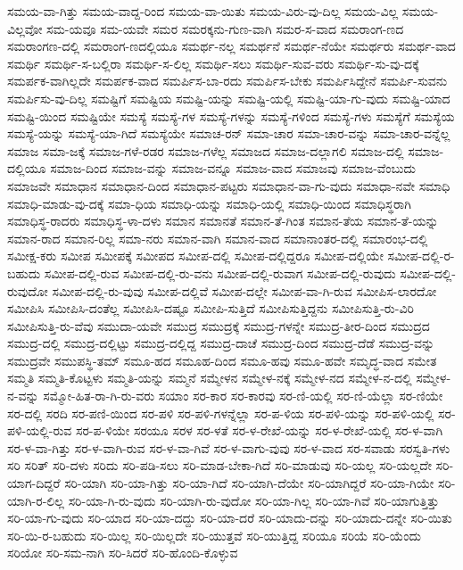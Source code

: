 {ಸಮಯ-ವಾ-ಗಿತ್ತು
ಸಮಯ-ವಾದ್ದ-ರಿಂದ
ಸಮಯ-ವಾ-ಯಿತು
ಸಮಯ-ವಿರು-ವು-ದಿಲ್ಲ
ಸಮಯ-ವಿಲ್ಲ
ಸಮಯ-ವಿಲ್ಲವೋ
ಸಮ-ಯವೂ
ಸಮ-ಯವೇ
ಸಮರ
ಸಮರಕ್ಕನು-ಗುಣ-ವಾಗಿ
ಸಮರ-ಸ-ವಾದ
ಸಮರಾಂಗ-ಣದ
ಸಮರಾಂಗಣ-ದಲ್ಲಿ
ಸಮರಾಂಗ-ಣದಲ್ಲಿಯೂ
ಸಮರ್ಥ-ನಲ್ಲ
ಸಮರ್ಥನೆ
ಸಮರ್ಥ-ನೆಯೇ
ಸಮರ್ಥರು
ಸಮರ್ಥ-ವಾದ
ಸಮರ್ಥಿ
ಸಮರ್ಥಿ-ಸ-ಬಲ್ಲಿರಾ
ಸಮರ್ಥಿ-ಸ-ಲಿಲ್ಲ
ಸಮರ್ಥಿ-ಸಲು
ಸಮರ್ಥಿ-ಸುವ-ವರು
ಸಮರ್ಥಿ-ಸು-ವು-ದಕ್ಕೆ
ಸಮರ್ಪಕ-ವಾಗಿಲ್ಲದೇ
ಸಮರ್ಪಕ-ವಾದ
ಸಮರ್ಪಿಸ-ಬಾ-ರದು
ಸಮರ್ಪಿಸ-ಬೇಕು
ಸಮರ್ಪಿಸಿದ್ದೇನೆ
ಸಮರ್ಪಿ-ಸುವನು
ಸಮರ್ಪಿಸು-ವು-ದಿಲ್ಲ
ಸಮಷ್ಟಿಗೆ
ಸಮಷ್ಟಿಯ
ಸಮಷ್ಟಿ-ಯನ್ನು
ಸಮಷ್ಟಿ-ಯಲ್ಲಿ
ಸಮಷ್ಟಿ-ಯಾ-ಗು-ವುದು
ಸಮಷ್ಟಿ-ಯಾದ
ಸಮಷ್ಟಿ-ಯಿಂದ
ಸಮಷ್ಟಿಯೇ
ಸಮಸ್ಯೆ
ಸಮಸ್ಯೆ-ಗಳ
ಸಮಸ್ಯೆ-ಗಳನ್ನು
ಸಮಸ್ಯೆ-ಗಳಿಂದ
ಸಮಸ್ಯೆ-ಗಳು
ಸಮಸ್ಯೆಗೆ
ಸಮಸ್ಯೆಯ
ಸಮಸ್ಯೆ-ಯನ್ನು
ಸಮಸ್ಯೆ-ಯಾ-ಗಿದೆ
ಸಮಸ್ಯೆಯೇ
ಸಮಾಚ-ರನ್
ಸಮಾ-ಚಾರ
ಸಮಾ-ಚಾರ-ವನ್ನು
ಸಮಾ-ಚಾರ-ವನ್ನೆಲ್ಲ
ಸಮಾಜ
ಸಮಾ-ಜಕ್ಕೆ
ಸಮಾಜ-ಗಳೆ-ರಡರ
ಸಮಾಜ-ಗಳೆಲ್ಲ
ಸಮಾಜದ
ಸಮಾಜ-ದಲ್ಲಾಗಲಿ
ಸಮಾಜ-ದಲ್ಲಿ
ಸಮಾಜ-ದಲ್ಲಿಯೂ
ಸಮಾಜ-ದಿಂದ
ಸಮಾಜ-ವನ್ನು
ಸಮಾಜ-ವನ್ನೂ
ಸಮಾಜ-ವಾದ
ಸಮಾಜವು
ಸಮಾಜ-ವೆಂಬುದು
ಸಮಾಜವೇ
ಸಮಾಧಾನ
ಸಮಾಧಾನ-ದಿಂದ
ಸಮಾಧಾನ-ಪಟ್ಟರು
ಸಮಾಧಾನ-ವಾ-ಗು-ವುದು
ಸಮಾಧಾ-ನವೇ
ಸಮಾಧಿ
ಸಮಾಧಿ-ಮಾಡು-ವು-ದಕ್ಕೆ
ಸಮಾ-ಧಿಯ
ಸಮಾಧಿ-ಯನ್ನು
ಸಮಾಧಿ-ಯಲ್ಲಿ
ಸಮಾಧಿ-ಯಿಂದ
ಸಮಾಧಿಸ್ಥರಾಗಿ
ಸಮಾಧಿಸ್ಥ-ರಾದರು
ಸಮಾಧಿಸ್ಥ-ಳಾ-ದಳು
ಸಮಾನ
ಸಮಾನತೆ
ಸಮಾನ-ತೆ-ಗಿಂತ
ಸಮಾನ-ತೆಯ
ಸಮಾನ-ತೆ-ಯನ್ನು
ಸಮಾನ-ರಾದ
ಸಮಾನ-ರಿಲ್ಲ
ಸಮಾ-ನರು
ಸಮಾನ-ವಾಗಿ
ಸಮಾನ-ವಾದ
ಸಮಾನಾಂತರ-ದಲ್ಲಿ
ಸಮಾರಂಭ-ದಲ್ಲಿ
ಸಮೀಕ್ಷ-ಕರು
ಸಮೀಪ
ಸಮೀಪಕ್ಕೆ
ಸಮೀಪದ
ಸಮೀಪ-ದಲ್ಲಿ
ಸಮೀಪ-ದಲ್ಲಿದ್ದರೂ
ಸಮೀಪ-ದಲ್ಲಿಯೇ
ಸಮೀಪ-ದಲ್ಲಿ-ರ-ಬಹುದು
ಸಮೀಪ-ದಲ್ಲಿ-ರುವ
ಸಮೀಪ-ದಲ್ಲಿ-ರು-ವನು
ಸಮೀಪ-ದಲ್ಲಿ-ರುವಾಗ
ಸಮೀಪ-ದಲ್ಲಿ-ರುವುದು
ಸಮೀಪ-ದಲ್ಲಿ-ರುವುದೋ
ಸಮೀಪ-ದಲ್ಲಿ-ರು-ವುವು
ಸಮೀಪ-ದಲ್ಲಿವೆ
ಸಮೀಪ-ದಲ್ಲೇ
ಸಮೀಪ-ವಾ-ಗಿ-ರುವ
ಸಮೀಪಿಸ-ಲಾರದೋ
ಸಮೀಪಿಸಿ
ಸಮೀಪಿಸಿ-ದಂತೆಲ್ಲ
ಸಮೀಪಿಸಿ-ದಷ್ಟೂ
ಸಮೀಪಿ-ಸುತ್ತಿದೆ
ಸಮೀಪಿಸುತ್ತಿದ್ದನು
ಸಮೀಪಿಸುತ್ತಿ-ರು-ವಿರಿ
ಸಮೀಪಿಸುತ್ತಿ-ರು-ವೆವು
ಸಮುದಾ-ಯವೇ
ಸಮುದ್ರ
ಸಮುದ್ರಕ್ಕೆ
ಸಮುದ್ರ-ಗಳನ್ನೇ
ಸಮುದ್ರ-ತೀರ-ದಿಂದ
ಸಮುದ್ರದ
ಸಮುದ್ರ-ದಲ್ಲಿ
ಸಮುದ್ರ-ದಲ್ಲಿಟ್ಟು
ಸಮುದ್ರ-ದಲ್ಲಿದ್ದ
ಸಮುದ್ರ-ದಾಚೆ
ಸಮುದ್ರ-ದಿಂದ
ಸಮುದ್ರ-ದೆಡೆ
ಸಮುದ್ರ-ವನ್ನು
ಸಮುದ್ರವೇ
ಸಮುಪಸ್ಥಿ-ತಮ್
ಸಮೂ-ಹದ
ಸಮೂಹ-ದಿಂದ
ಸಮೂ-ಹವು
ಸಮೂ-ಹವೇ
ಸಮೃದ್ಧ-ವಾದ
ಸಮೇತ
ಸಮ್ಮತಿ
ಸಮ್ಮತಿ-ಕೊಟ್ಟಳು
ಸಮ್ಮತಿ-ಯನ್ನು
ಸಮ್ಮನೆ
ಸಮ್ಮೇಳನ
ಸಮ್ಮೇಳ-ನಕ್ಕೆ
ಸಮ್ಮೇಳ-ನದ
ಸಮ್ಮೇಳ-ನ-ದಲ್ಲಿ
ಸಮ್ಮೇಳ-ನ-ವನ್ನು
ಸಮ್ಮೋ-ಹಿತ-ರಾ-ಗಿ-ರು-ವರು
ಸಯಾಂ
ಸರ-ಕಾರ
ಸರ-ಕಾರವು
ಸರ-ಣಿ-ಯಲ್ಲಿ
ಸರ-ಣಿ-ಯೆಲ್ಲಾ
ಸರ-ಣಿಯೇ
ಸರ-ದಲ್ಲಿ
ಸರದಿ
ಸರ-ಪಣಿ-ಯಿಂದ
ಸರ-ಪಳಿ
ಸರ-ಪಳಿ-ಗಳನ್ನೆಲ್ಲಾ
ಸರ-ಪ-ಳಿಯ
ಸರ-ಪಳಿ-ಯನ್ನು
ಸರ-ಪಳಿ-ಯಲ್ಲಿ
ಸರ-ಪಳಿ-ಯಲ್ಲಿ-ರುವ
ಸರ-ಪ-ಳಿಯೇ
ಸರಯೂ
ಸರಳ
ಸರ-ಳತೆ
ಸರ-ಳ-ರೇಖೆ-ಯನ್ನು
ಸರ-ಳ-ರೇಖೆ-ಯಲ್ಲಿ
ಸರ-ಳ-ವಾಗಿ
ಸರ-ಳ-ವಾ-ಗಿತ್ತು
ಸರ-ಳ-ವಾಗಿ-ರುವ
ಸರ-ಳ-ವಾ-ಗಿವೆ
ಸರ-ಳ-ವಾಗು-ವುವು
ಸರ-ಳ-ವಾದ
ಸರ-ಸವಾಡು
ಸರಸ್ವತಿ-ಗಳು
ಸರಿ
ಸರಿತ್
ಸರಿ-ದಳು
ಸರಿದು
ಸರಿ-ಪಡಿ-ಸಲು
ಸರಿ-ಮಾಡ-ಬೇಕಾ-ಗಿದೆ
ಸರಿ-ಮಾಡುವು
ಸರಿ-ಯಲ್ಲ
ಸರಿ-ಯಲ್ಲದೇ
ಸರಿ-ಯಾಗ-ದಿದ್ದರೆ
ಸರಿ-ಯಾಗಿ
ಸರಿ-ಯಾ-ಗಿತ್ತು
ಸರಿ-ಯಾ-ಗಿದೆ
ಸರಿ-ಯಾಗಿ-ದೆಯೇ
ಸರಿ-ಯಾಗಿದ್ದರೆ
ಸರಿ-ಯಾ-ಗಿಯೇ
ಸರಿ-ಯಾಗಿ-ರ-ಲಿಲ್ಲ
ಸರಿ-ಯಾ-ಗಿ-ರು-ವುದು
ಸರಿ-ಯಾಗಿ-ರು-ವುದೋ
ಸರಿ-ಯಾ-ಗಿಲ್ಲ
ಸರಿ-ಯಾ-ಗಿವೆ
ಸರಿ-ಯಾಗುತ್ತಿತ್ತು
ಸರಿ-ಯಾ-ಗು-ವುದು
ಸರಿ-ಯಾದ
ಸರಿ-ಯಾ-ದದ್ದು
ಸರಿ-ಯಾ-ದರೆ
ಸರಿ-ಯಾದು-ದನ್ನು
ಸರಿ-ಯಾದು-ದನ್ನೇ
ಸರಿ-ಯಿತು
ಸರಿ-ಯಿ-ರ-ಬಹುದು
ಸರಿ-ಯಿಲ್ಲ
ಸರಿ-ಯಿಲ್ಲದೇ
ಸರಿ-ಯುತ್ತವೆ
ಸರಿ-ಯುತ್ತಿದ್ದ
ಸರಿಯೂ
ಸರಿಯೆ
ಸರಿ-ಯೆಂದು
ಸರಿಯೋ
ಸರಿ-ಸಮ-ನಾಗಿ
ಸರಿ-ಸಿದರೆ
ಸರಿ-ಹೊಂದಿ-ಕೊಳ್ಳುವ
}
